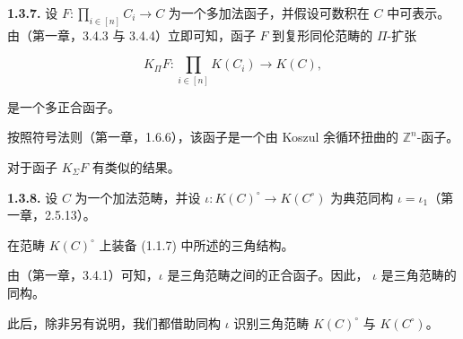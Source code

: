 
\clearpage
{}%
\begingroup
\small
\setlength{\emergencystretch}{1.5em}%
\setlength{\abovedisplayskip}{4pt plus 2pt minus 2pt}%
\setlength{\belowdisplayskip}{4pt plus 2pt minus 2pt}%

\noindent\textbf{1.3.7.}\quad
{}
设
$F\colon \prod_{i\in[n]} C_i\longrightarrow C$
为一个多加法函子，并假设可数积在 $C$ 中可表示。由（第一章，3.4.3 与
3.4.4）立即可知，函子 $F$ 到复形同伦范畴的 $\Pi$-扩张

\[
  K_{\Pi}F\colon \prod_{i\in[n]} K(C_i)\longrightarrow K(C),
\]

\noindent 是一个多正合函子。

按照符号法则（第一章，1.6.6），该函子是一个由 Koszul 余循环扭曲的
$\mathbb Z^n$-函子。

对于函子 $K_{\Sigma}F$ 有类似的结果。

\medskip
\noindent\textbf{1.3.8.}\quad
{}
设 $C$ 为一个加法范畴，并设
$\iota\colon K(C)^\circ\longrightarrow K(C^\circ)$ 为典范同构
$\iota=\iota_1$（第一章，2.5.13）。

在范畴 $K(C)^\circ$ 上装备 (1.1.7) 中所述的三角结构。

由（第一章，3.4.1）可知，$\iota$ 是三角范畴之间的正合函子。因此，
$\iota$ 是三角范畴的同构。

此后，除非另有说明，我们都借助同构 $\iota$ 识别三角范畴
$K(C)^\circ$ 与 $K(C^\circ)$。
\endgroup


